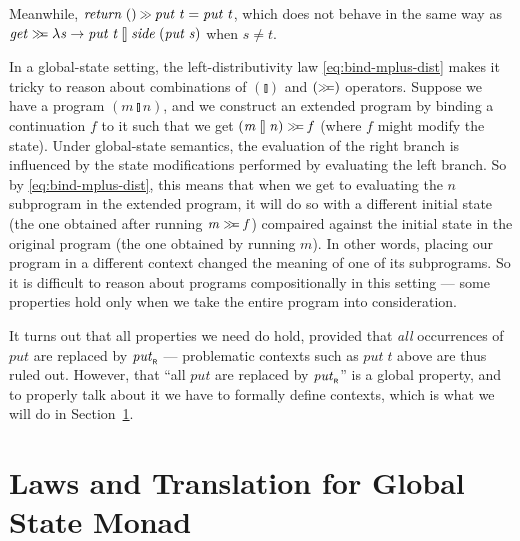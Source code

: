 \documentclass{llncs}
\newcommand{\Varid}[1]{\mathit{#1}}
\let\Varid\mathit
\begin{document}
Meanwhile, \ensuremath{\Varid{return}\;()\mathbin{\hstretch{0.7}{>\!\!>}}\Varid{put}\;\Varid{t}\mathrel{=}\Varid{put}\;\Varid{t}}, which does not behave in the same way as \ensuremath{\Varid{get}\mathrel{\hstretch{0.7}{>\!\!>\!\!=}}\lambda \Varid{s}\to \Varid{put}\;\Varid{t}\mathbin{\talloblong}\Varid{side}\;(\Varid{put}\;\Varid{s})} when $s \neq t$.

In a global-state setting, the left-distributivity law \eqref{eq:bind-mplus-dist} makes it tricky to reason about combinations of \ensuremath{(\talloblong)} and \ensuremath{(\mathrel{\hstretch{0.7}{>\!\!>\!\!=}})} operators.
Suppose we have a program \ensuremath{(\Varid{m}\mathbin{\talloblong}\Varid{n})}, and we construct an extended program by binding a continuation \ensuremath{\Varid{f}} to it such that we get \ensuremath{(\Varid{m}\mathbin{\talloblong}\Varid{n})\mathrel{\hstretch{0.7}{>\!\!>\!\!=}}\Varid{f}} (where \ensuremath{\Varid{f}} might modify the state).
Under global-state semantics, the evaluation of the right branch is influenced by the state modifications performed by evaluating the left branch.
So by \eqref{eq:bind-mplus-dist}, this means that when we get to evaluating the \ensuremath{\Varid{n}} subprogram in the extended program, it will do so with a different initial state (the one obtained after running \ensuremath{\Varid{m}\mathrel{\hstretch{0.7}{>\!\!>\!\!=}}\Varid{f}}) compaired against the initial state in the original program (the one obtained by running \ensuremath{\Varid{m}}).
In other words, placing our program in a different context changed the meaning of one of its subprograms.
So it is difficult to reason about programs compositionally in this setting --- some properties hold only when we take the entire program into consideration.

It turns out that all properties we need do hold, provided that {\em all} occurrences of \ensuremath{\Varid{put}} are replaced by \ensuremath{\Varid{put}_{\scaleobj{0.7}{\sf R}}} --- problematic contexts such as \ensuremath{\Varid{put}\;\Varid{t}} above are thus ruled out.
However, that ``all \ensuremath{\Varid{put}} are replaced by \ensuremath{\Varid{put}_{\scaleobj{0.7}{\sf R}}}'' is a global property, and to properly talk about it we have to formally define contexts, which is what we will do in Section~\ref{sec:ctxt-trans}.

\section{Laws and Translation for Global State Monad}
\label{sec:ctxt-trans}
\end{document}
